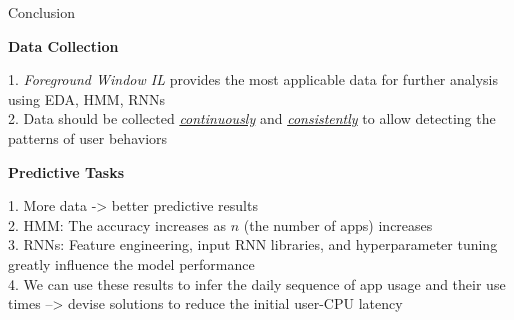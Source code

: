 \documentclass[final]{beamer}
\newlength{\colwidth}
\begin{document}
\begin{frame}[t]
\begin{columns}[t]
\begin{column}{\colwidth}
\begin{block}
              

      \end{block}

      \begin{block} {\LARGE{Conclusion}}

        \begin{itemize}
          \large{
          \item \textbf{Data Collection}

                1.  \textit{Foreground Window IL} provides the most applicable data for further analysis using EDA, HMM, RNNs \\
                2. Data should be collected \underline{\textit{continuously}} and \underline{\textit{consistently}} to allow detecting the patterns of user behaviors
          \item \textbf{Predictive Tasks}

                1. More data -> better predictive results \\
                2. HMM: The accuracy increases as $n$ (the number of apps) increases \\
                3. RNNs: Feature engineering, input RNN libraries, and hyperparameter tuning greatly influence the model performance \\
                4. We can use these results to infer the daily sequence of app usage and their use times --> devise solutions to reduce the initial user-CPU latency

}
\end{itemize}
\end{block}
\end{column}
\end{columns}
\end{frame}
\end{document}
